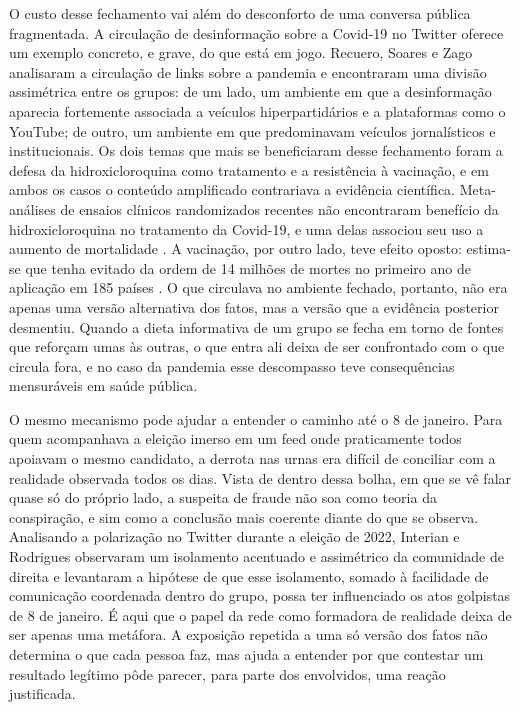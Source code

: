 \documentclass[conference]{IEEEtran}
\begin{document}
O custo desse fechamento vai além do desconforto de uma conversa pública fragmentada. A circulação de desinformação sobre a Covid-19 no Twitter oferece um exemplo concreto, e grave, do que está em jogo. Recuero, Soares e Zago \cite{b_recuero2021} analisaram a circulação de links sobre a pandemia e encontraram uma divisão assimétrica entre os grupos: de um lado, um ambiente em que a desinformação aparecia fortemente associada a veículos hiperpartidários e a plataformas como o YouTube; de outro, um ambiente em que predominavam veículos jornalísticos e institucionais. Os dois temas que mais se beneficiaram desse fechamento foram a defesa da hidroxicloroquina como tratamento e a resistência à vacinação, e em ambos os casos o conteúdo amplificado contrariava a evidência científica. Meta-análises de ensaios clínicos randomizados recentes não encontraram benefício da hidroxicloroquina no tratamento da Covid-19, e uma delas associou seu uso a aumento de mortalidade \cite{b_axfors2021, b_singh2020}. A vacinação, por outro lado, teve efeito oposto: estima-se que tenha evitado da ordem de 14 milhões de mortes no primeiro ano de aplicação em 185 países \cite{b_watson2022}. O que circulava no ambiente fechado, portanto, não era apenas uma versão alternativa dos fatos, mas a versão que a evidência posterior desmentiu. Quando a dieta informativa de um grupo se fecha em torno de fontes que reforçam umas às outras, o que entra ali deixa de ser confrontado com o que circula fora, e no caso da pandemia esse descompasso teve consequências mensuráveis em saúde pública.

O mesmo mecanismo pode ajudar a entender o caminho até o 8 de janeiro. Para quem acompanhava a eleição imerso em um feed onde praticamente todos apoiavam o mesmo candidato, a derrota nas urnas era difícil de conciliar com a realidade observada todos os dias. Vista de dentro dessa bolha, em que se vê falar quase só do próprio lado, a suspeita de fraude não soa como teoria da conspiração, e sim como a conclusão mais coerente diante do que se observa. Analisando a polarização no Twitter durante a eleição de 2022, Interian e Rodrigues \cite{b_interian2023} observaram um isolamento acentuado e assimétrico da comunidade de direita e levantaram a hipótese de que esse isolamento, somado à facilidade de comunicação coordenada dentro do grupo, possa ter influenciado os atos golpistas de 8 de janeiro. É aqui que o papel da rede como formadora de realidade deixa de ser apenas uma metáfora. A exposição repetida a uma só versão dos fatos não determina o que cada pessoa faz, mas ajuda a entender por que contestar um resultado legítimo pôde parecer, para parte dos envolvidos, uma reação justificada.
\end{document}
